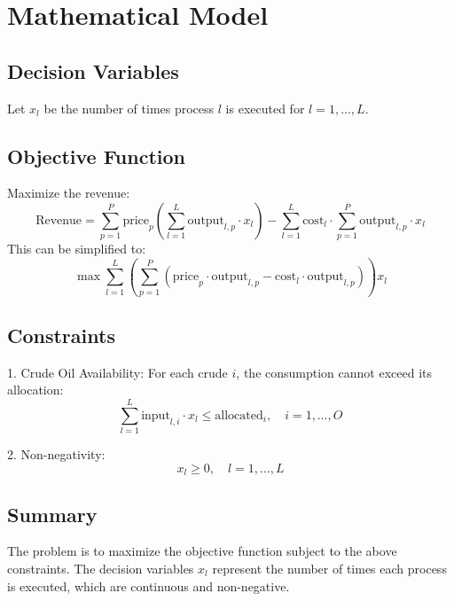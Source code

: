 \documentclass{article}
\begin{document}
\section*{Mathematical Model}

\subsection*{Decision Variables}
Let \( x_l \) be the number of times process \( l \) is executed for \( l = 1, \ldots, L \).

\subsection*{Objective Function}
Maximize the revenue:
\[
\text{Revenue} = \sum_{p=1}^{P} \text{price}_p \left( \sum_{l=1}^{L} \text{output}_{l,p} \cdot x_l \right) - \sum_{l=1}^{L} \text{cost}_l \cdot \sum_{p=1}^{P} \text{output}_{l,p} \cdot x_l
\]
This can be simplified to:
\[
\max \sum_{l=1}^{L} \left( \sum_{p=1}^{P} (\text{price}_p \cdot \text{output}_{l,p} - \text{cost}_l \cdot \text{output}_{l,p}) \right) x_l
\]

\subsection*{Constraints}
1. Crude Oil Availability:
   For each crude \( i \), the consumption cannot exceed its allocation:
   \[
   \sum_{l=1}^{L} \text{input}_{l,i} \cdot x_l \leq \text{allocated}_i, \quad i = 1, \ldots, O
   \]

2. Non-negativity:
   \[
   x_l \geq 0, \quad l = 1, \ldots, L
   \]

\subsection*{Summary}
The problem is to maximize the objective function subject to the above constraints. The decision variables \( x_l \) represent the number of times each process is executed, which are continuous and non-negative.
\end{document}
